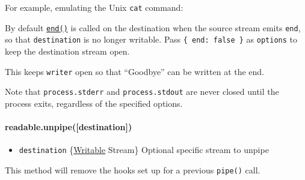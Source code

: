 For example, emulating the Unix \texttt{cat} command:

\begin{Shaded}
\begin{Highlighting}[]
\NormalTok{(}\NormalTok{);}
\end{Highlighting}
\end{Shaded}

By default
\hyperref[streamux5fwritableux5fendux5fchunkux5fencodingux5fcallback]{\texttt{end()}}
is called on the destination when the source stream emits \texttt{end},
so that \texttt{destination} is no longer writable. Pass
\texttt{\{ end: false \}} as \texttt{options} to keep the destination
stream open.

This keeps \texttt{writer} open so that ``Goodbye'' can be written at
the end.

\begin{Shaded}
\begin{Highlighting}[]
\NormalTok{: } \NormalTok{\});}
\NormalTok{(}\NormalTok{, }\NormalTok{() \{}
  \NormalTok{(}\NormalTok{);}
\NormalTok{\});}
\end{Highlighting}
\end{Shaded}

Note that \texttt{process.stderr} and \texttt{process.stdout} are never
closed until the process exits, regardless of the specified options.

\paragraph{readable.unpipe({[}destination{]})}\label{readable.unpipedestination}

\begin{itemize}
\itemsep1pt\parskip0pt
\item
  \texttt{destination}
  \{\hyperref[streamux5fclassux5fstreamux5fwritable]{Writable} Stream\}
  Optional specific stream to unpipe
\end{itemize}

This method will remove the hooks set up for a previous \texttt{pipe()}
call.

